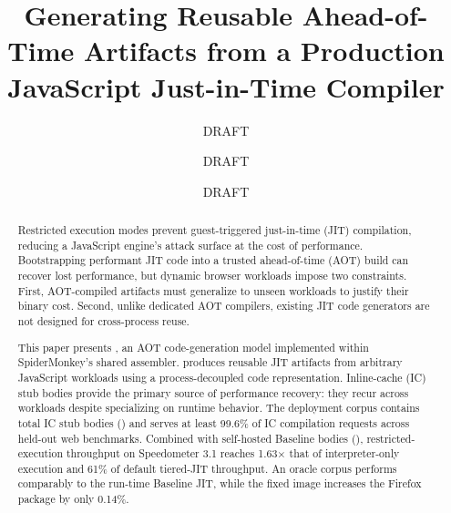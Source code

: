 \documentclass[sigplan,screen,review,anonymous]{acmart}
\newcommand{\sptrichitrate}{99.6\%}
\newcommand{\spaotdefault}{61\%}
\newcommand{\browserpackagegrowthpct}{0.14\%}
\newcommand{\spaotratio}{1.63$\times$}
\newcommand{\AM}{\leavevmode{\sc AmberMonkey}}
\begin{document}
\raggedbottom

\title[Generating Reusable AOT Artifacts from a Production JavaScript JIT Compiler]{Generating Reusable Ahead-of-Time Artifacts from a Production JavaScript Just-in-Time Compiler}

\author{DRAFT}

\author{DRAFT}

\author{DRAFT}

\renewcommand{\shortauthors}{CGO 2027 Submission \#625}

\begin{abstract} Restricted execution modes prevent guest-triggered just-in-time (JIT) compilation, reducing a JavaScript engine's attack surface at the
cost of performance. Bootstrapping performant JIT code into a trusted ahead-of-time (AOT) build can recover lost performance, but dynamic browser workloads impose two constraints. First, AOT-compiled artifacts must generalize to unseen workloads to justify their binary cost. Second, unlike dedicated AOT compilers, existing JIT code generators are not designed for cross-process reuse.

This paper presents \AM{}, an AOT code-generation model implemented within SpiderMonkey's shared assembler. 
\AM{} produces reusable JIT artifacts from arbitrary
JavaScript workloads using a process-decoupled code representation.
Inline-cache (IC) stub bodies provide the primary source of performance recovery: they recur across workloads despite specializing on runtime behavior. The deployment corpus contains \icstubcount{} total IC stub bodies (\icstubcodesize{}) and serves at least \sptrichitrate{} of IC compilation requests across held-out web benchmarks. Combined with \selfhostedcount{} self-hosted Baseline bodies (\baselinebodycodesize{}), restricted-execution throughput on Speedometer 3.1 reaches \spaotratio{} that of interpreter-only execution and \spaotdefault{} of default tiered-JIT throughput. An oracle corpus performs comparably to the run-time Baseline JIT, while the fixed image increases the Firefox package by only \browserpackagegrowthpct{}.

\end{abstract}
\end{document}
